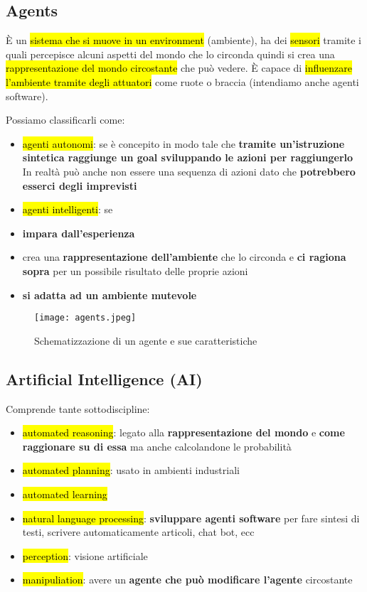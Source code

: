 \subsection{Agents}

È un \hl{sistema che si muove in un environment} (ambiente), ha dei \hl{sensori} tramite i quali percepisce alcuni aspetti del mondo che lo circonda quindi si crea una \hl{rappresentazione del mondo circostante} che può vedere. È capace di \hl{influenzare l'ambiente tramite degli attuatori} come ruote o braccia (intendiamo anche agenti software).

Possiamo classificarli come:
\begin{itemize}
	\item \hl{agenti autonomi}: se è concepito in modo tale che \textbf{tramite un'istruzione sintetica raggiunge un goal sviluppando le azioni per raggiungerlo}  In realtà può anche non essere una sequenza di azioni dato che \textbf{potrebbero esserci degli imprevisti}
	\item \hl{agenti intelligenti}: se
	\item \textbf{impara dall'esperienza}
	\item crea una \textbf{rappresentazione dell'ambiente} che lo circonda e \textbf{ci ragiona sopra} per un possibile risultato delle proprie azioni
	\item \textbf{si adatta ad un ambiente mutevole}
\end{itemize}

\begin{figure}[H]
\centering
\texttt{[image: agents.jpeg]}
\caption{Schematizzazione di un agente e sue caratteristiche} 
\label{agente}
\end{figure}


\subsection{Artificial Intelligence (AI)}

Comprende tante sottodiscipline:
\begin{itemize}
	\item \hl{automated reasoning}: legato alla \textbf{rappresentazione del mondo} e \textbf{come raggionare su di essa} ma anche calcolandone le probabilità
	\item \hl{automated planning}: usato in ambienti industriali
	\item \hl{automated learning}
	\item \hl{natural language processing}: \textbf{sviluppare agenti software} per fare sintesi di testi, scrivere automaticamente articoli, chat bot, ecc 
	\item \hl{perception}: visione artificiale
	\item \hl{manipuliation}: avere un \textbf{agente che può modificare l'agente} circostante
\end{itemize}



